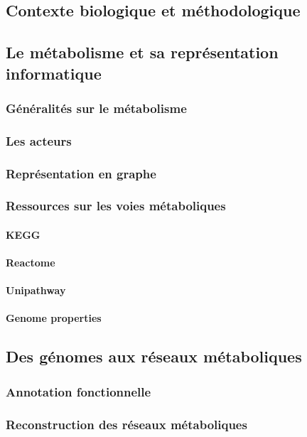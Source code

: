 \begin{refsection}
	\chapter{Contexte biologique et méthodologique }

    \section{Le métabolisme et sa représentation informatique}
    \subsection{Généralités sur le métabolisme}
    \subsection{Les acteurs}
    \subsection{Représentation en graphe}
    \subsection{Ressources sur les voies métaboliques}
    \subsubsection{KEGG}
    \subsubsection{Reactome}
    \subsubsection{Unipathway}
    \subsubsection{Genome properties}
    
    \section{Des génomes aux réseaux métaboliques}
    \subsection{Annotation fonctionnelle}\label{subsect:annotation}
    \subsection{Reconstruction des réseaux métaboliques}

\end{refsection}
